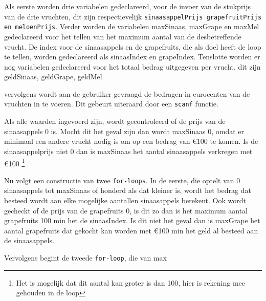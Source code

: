 Als eerste worden drie variabelen gedeclareerd, voor de invoer van de stukprijs van de drie vruchten, dit zijn respectievelijk {\tt sinaasappelPrijs grapefruitPrijs en meloenPrijs}.
Verder worden de variabelen maxSinaas, maxGrape en maxMel gedeclareerd voor het tellen van het maximum aantal van de desbetreffende vrucht.
De index voor de sinaasappels en de grapefruits, die als doel heeft de loop te tellen, worden gedeclareerd als sinaasIndex en grapeIndex.
Tenslotte worden er nog variabelen gedeclareerd voor het totaal bedrag uitgegeven per vrucht, dit zijn geldSinaas, geldGrape, geldMel.

vervolgens wordt aan de gebruiker gevraagd de bedragen in eurocenten van de vruchten  in te voeren.
Dit gebeurt uiteraard door een {\tt scanf} functie.

Als alle waarden ingevoerd zijn, wordt gecontroleerd of de prijs van de sinaasappels 0 is.
Mocht dit het geval zijn dan wordt maxSinaas 0, omdat er minimaal een andere vrucht nodig is om op een bedrag van \euro100 te komen.
Is de sinaasappelprijs niet 0 dan is maxSinaas het aantal sinaasappels verkregen met \euro100 \footnote{Het is mogelijk dat dit aantal kan groter is dan 100, hier is rekening mee gehouden in de loop}

Nu volgt een constructie van twee {\tt for-loops}.
In de eerste, die optelt van 0 sinaasappels tot maxSinaas of honderd als dat kleiner is, wordt het bedrag dat besteed wordt aan elke mogelijke aantallen sinaasappels berekent.
Ook wordt gecheckt of de prijs van de grapefruits 0, is dit zo dan is het maximum aantal grapefruits 100 min het de sinaasIndex.
Is dit niet het geval dan is maxGrape het aantal grapefruits dat gekocht kan worden met \euro100 min het geld al besteed aan de sinaasappels.

Vervolgens begint de tweede {\tt for-loop}, die van max